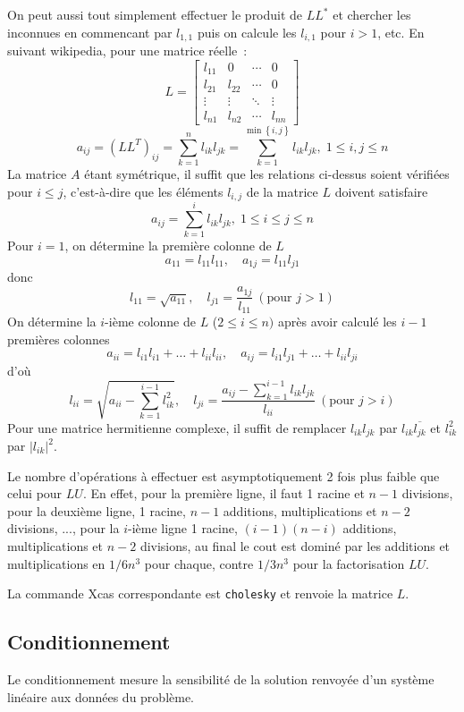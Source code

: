 \documentclass[a4paper,11pt]{article}
\begin{document}
\begin{giacjshere}
On peut aussi tout simplement effectuer le produit de $L L^*$ et
chercher les inconnues en commencant par $l_{1,1}$ puis on calcule
les $l_{i,1}$ pour $i>1$, etc. En suivant wikipedia, pour une matrice r\'eelle~:
\[ L=\begin{bmatrix}
l_{11}& 0 & \cdots & 0 \\
l_{21} & l_{22}& \cdots & 0\\
\vdots & \vdots & \ddots & \vdots\\
l_{n1} & l_{n2} & \cdots & l_{nn}
\end{bmatrix} \]
\[ a_{ij}=\left(LL^{T}\right)_{ij}={\sum_{k=1}^{n}l_{ik}l_{jk}}=
{\sum_{k=1}^{\min\left\{ i,j\right\} }l_{ik}l_{jk}},\;1\leq i,j\leq n \]
La matrice $A$ étant sym\'etrique, il suffit que les relations ci-dessus
soient v\'erifi\'ees pour $i \leq j$, 
c'est-à-dire que les \'el\'ements $l_{i,j}$ de la matrice $L$ doivent
satisfaire
\[ a_{ij}={\sum_{k=1}^{i}l_{ik}l_{jk}},\;1\leq i\leq j\leq n \]
Pour $i=1$, on d\'etermine la premi\`ere colonne de $L$
\[ a_{11}=l_{11}l_{11}, \quad a_{1j}=l_{11}l_{j1}\]
donc
\[ l_{11}=\sqrt{a_{11}}, \quad l_{j1}=\frac{a_{1j}}{l_{11}}
\ (\mbox{pour } j>1) \]
On d\'etermine la $i$-i\`eme colonne de $L$ ($2\leq i\leq n)$ apr\`es avoir
calculé les $i-1$ premi\`eres colonnes
\[ a_{ii}=l_{i1}l_{i1}+\ldots+l_{ii}l_{ii}, \quad
a_{ij}=l_{i1}l_{j1}+\ldots+l_{ii}l_{ji} \]
d'où 
\[ l_{ii}= \sqrt{{a_{ii}-{\sum_{k=1}^{i-1}l_{ik}^{2}}}}, \quad
l_{ji}=\frac{a_{ij}-{\sum_{k=1}^{i-1}l_{ik}l_{jk}}}{l_{ii}} \ 
(\mbox{pour } j > i)\]
Pour une matrice hermitienne complexe, il suffit de remplacer
$l_{ik}l_{jk}$ par $l_{ik}\overline{l_{jk}}$ et $l_{ik}^{2}$ par
$|l_{ik}|^{2}$.

Le nombre d'op\'erations \`a effectuer est asymptotiquement
2 fois plus faible que celui pour $LU$. En effet,
pour la premi\`ere ligne, il faut 1 racine et $n-1$ divisions,
pour la deuxi\`eme ligne, 1 racine, $n-1$ additions, multiplications
et $n-2$ divisions, ..., pour la $i$-i\`eme ligne 1 racine,
$(i-1)(n-i)$ additions, multiplications et $n-2$ divisions, au final
le cout est domin\'e par les additions et multiplications en $1/6n^3$
pour chaque, contre $1/3n^3$ pour la
factorisation $LU$.

La commande Xcas correspondante est \verb|cholesky| et renvoie
la matrice $L$.

\subsection{Conditionnement}  
Le conditionnement mesure la sensibilit\'e de la solution renvoy\'ee d'un
syst\`eme lin\'eaire aux donn\'ees du probl\`eme.


\end{giacjshere}
\end{document}
